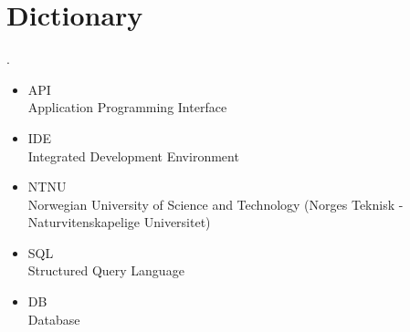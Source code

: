 \section{Dictionary}.
\begin{itemize}
\item API \\ Application Programming Interface
\item IDE \\ Integrated Development Environment
\item NTNU \\ Norwegian University of Science and Technology (Norges Teknisk - Naturvitenskapelige Universitet)
\item SQL \\ Structured Query Language 
\item DB \\ Database 
\end{itemize}




